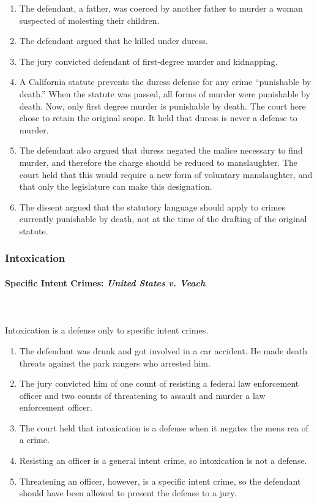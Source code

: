 \begin{enumerate}
    \item The defendant, a father, was coerced by another father to murder a 
    woman suspected of molesting their children.
    \item The defendant argued that he killed under duress.
    \item The jury convicted defendant of first-degree murder and kidnapping.
    \item A California statute prevents the duress defense for any crime 
    ``punishable by death.'' When the statute was passed, all forms of murder 
    were punishable by death. Now, only first degree murder is punishable by 
    death. The court here chose to retain the original scope. It held that 
    duress is never a defense to murder.
    \item The defendant also argued that duress negated the malice necessary 
    to find murder, and therefore the charge should be reduced to 
    manslaughter. The court held that this would require a new form of 
    voluntary manslaughter, and that only the legislature can make this 
    designation.
    \item The dissent argued that the statutory language should apply to 
    crimes currently punishable by death, not at the time of the drafting 
    of the original statute.
\end{enumerate}

\subsubsection{Intoxication}

\paragraph{Specific Intent Crimes: \emph{United States v. Veach}}
~\\\\
Intoxication is a defense only to specific intent crimes.

\begin{enumerate}
    \item The defendant was drunk and got involved in a car accident. He made 
    death threats against the park rangers who arrested him.
    \item The jury convicted him of one count of resisting a federal law 
    enforcement officer and two counts of threatening to assault and murder a 
    law enforcement officer.
    \item The court held that intoxication is a defense when it negates the 
    mens rea of a crime.
    \item Resisting an officer is a general intent crime, so intoxication is 
    not a defense.
    \item Threatening an officer, however, is a specific intent crime, so the 
    defendant should have been allowed to present the defense to a jury.
\end{enumerate}

